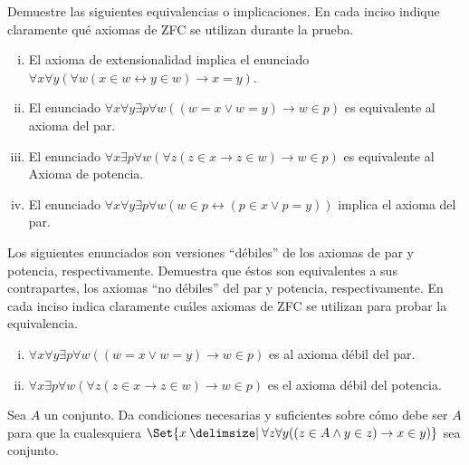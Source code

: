 \begin{exercise}[tezfc=1]
  Demuestre las siguientes equivalencias o implicaciones. En cada inciso indique claramente qué axiomas de ZFC se utilizan durante la prueba.
   \begin{enumerate}[i)]
       \item El axioma de extensionalidad implica el enunciado \(\forall x \forall y ( \forall w (x \in w \leftrightarrow y \in w) \rightarrow x=y ) \).
       \item El enunciado \(\forall x \forall y \exists p \forall w ( (w=x \lor w=y) \to w \in p ) \) es equivalente al axioma del par.
       \item El enunciado \(\forall x \exists p \forall w ( \forall z ( z \in x \to z \in w) \rightarrow w \in p )\) es equivalente al Axioma de potencia.
       \item El enunciado \( \forall x \forall y \exists p \forall w ( w \in p \leftrightarrow (p \in x \lor p=y ) ) \) implica el axioma del par.
   \end{enumerate}
\end{exercise}

\begin{exercise}
  Los siguientes enunciados son versiones ``débiles'' de los axiomas de par y potencia, respectivamente. Demuestra que éstos son equivalentes a sus contrapartes, los axiomas ``no débiles'' del par y potencia, respectivamente. En cada inciso indica claramente cuáles axiomas de ZFC se utilizan para probar la equivalencia.
  \begin{enumerate}[i)]
      \item \(\forall x \forall y \exists p \forall w ( (w=x \lor w=y) \to w \in p ) \) es al axioma débil del par.
      \item \(\forall x \exists p \forall w ( \forall z ( z \in x \to z \in w) \rightarrow w \in p )\) es el axioma débil del potencia.
  \end{enumerate}
\end{exercise}

\begin{exercise}
  Sea \(A\) un conjunto. Da condiciones necesarias y suficientes sobre cómo debe ser \(A\) para que la cualesquiera \(\Set{x \st \forall z \forall y((z \in A \land y \in z) \to x \in y)}\) sea conjunto.
\end{exercise}

